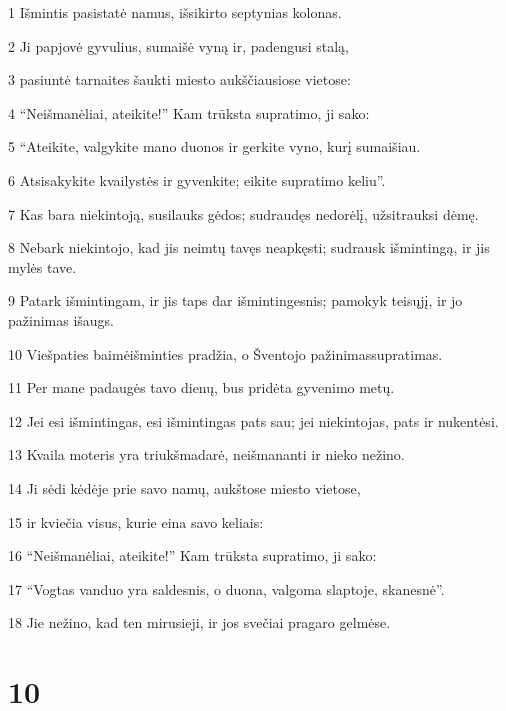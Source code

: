 \par 1 Išmintis pasistatė namus, išsikirto septynias kolonas. 
\par 2 Ji papjovė gyvulius, sumaišė vyną ir, padengusi stalą, 
\par 3 pasiuntė tarnaites šaukti miesto aukščiausiose vietose: 
\par 4 “Neišmanėliai, ateikite!” Kam trūksta supratimo, ji sako: 
\par 5 “Ateikite, valgykite mano duonos ir gerkite vyno, kurį sumaišiau. 
\par 6 Atsisakykite kvailystės ir gyvenkite; eikite supratimo keliu”. 
\par 7 Kas bara niekintoją, susilauks gėdos; sudraudęs nedorėlį, užsitrauksi dėmę. 
\par 8 Nebark niekintojo, kad jis neimtų tavęs neapkęsti; sudrausk išmintingą, ir jis mylės tave. 
\par 9 Patark išmintingam, ir jis taps dar išmintingesnis; pamokyk teisųjį, ir jo pažinimas išaugs. 
\par 10 Viešpaties baimė­išminties pradžia, o Šventojo pažinimas­supratimas. 
\par 11 Per mane padaugės tavo dienų, bus pridėta gyvenimo metų. 
\par 12 Jei esi išmintingas, esi išmintingas pats sau; jei niekintojas, pats ir nukentėsi. 
\par 13 Kvaila moteris yra triukšmadarė, neišmananti ir nieko nežino. 
\par 14 Ji sėdi kėdėje prie savo namų, aukštose miesto vietose, 
\par 15 ir kviečia visus, kurie eina savo keliais: 
\par 16 “Neišmanėliai, ateikite!” Kam trūksta supratimo, ji sako: 
\par 17 “Vogtas vanduo yra saldesnis, o duona, valgoma slaptoje, skanesnė”. 
\par 18 Jie nežino, kad ten mirusieji, ir jos svečiai pragaro gelmėse.



\chapter{10}


